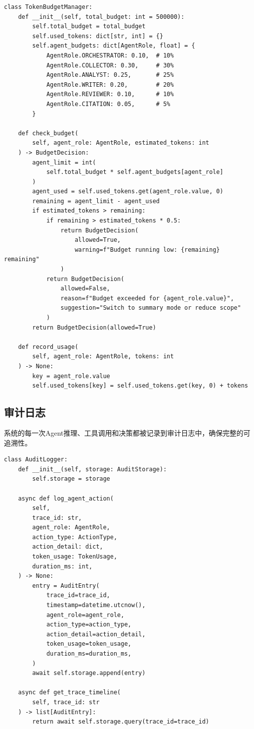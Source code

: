 \documentclass[12pt,a4paper]{ctexrep}
\begin{document}
\begin{lstlisting}[language=Python3,caption=Token预算管理器,label=lst:token-budget]
class TokenBudgetManager:
    def __init__(self, total_budget: int = 500000):
        self.total_budget = total_budget
        self.used_tokens: dict[str, int] = {}
        self.agent_budgets: dict[AgentRole, float] = {
            AgentRole.ORCHESTRATOR: 0.10,  # 10%
            AgentRole.COLLECTOR: 0.30,     # 30%
            AgentRole.ANALYST: 0.25,       # 25%
            AgentRole.WRITER: 0.20,        # 20%
            AgentRole.REVIEWER: 0.10,      # 10%
            AgentRole.CITATION: 0.05,      # 5%
        }

    def check_budget(
        self, agent_role: AgentRole, estimated_tokens: int
    ) -> BudgetDecision:
        agent_limit = int(
            self.total_budget * self.agent_budgets[agent_role]
        )
        agent_used = self.used_tokens.get(agent_role.value, 0)
        remaining = agent_limit - agent_used
        if estimated_tokens > remaining:
            if remaining > estimated_tokens * 0.5:
                return BudgetDecision(
                    allowed=True,
                    warning=f"Budget running low: {remaining} remaining"
                )
            return BudgetDecision(
                allowed=False,
                reason=f"Budget exceeded for {agent_role.value}",
                suggestion="Switch to summary mode or reduce scope"
            )
        return BudgetDecision(allowed=True)

    def record_usage(
        self, agent_role: AgentRole, tokens: int
    ) -> None:
        key = agent_role.value
        self.used_tokens[key] = self.used_tokens.get(key, 0) + tokens
\end{lstlisting}

\subsection{审计日志}

系统的每一次Agent推理、工具调用和决策都被记录到审计日志中，确保完整的可追溯性。

\begin{lstlisting}[language=Python3,caption=审计日志记录器,label=lst:audit]
class AuditLogger:
    def __init__(self, storage: AuditStorage):
        self.storage = storage

    async def log_agent_action(
        self,
        trace_id: str,
        agent_role: AgentRole,
        action_type: ActionType,
        action_detail: dict,
        token_usage: TokenUsage,
        duration_ms: int,
    ) -> None:
        entry = AuditEntry(
            trace_id=trace_id,
            timestamp=datetime.utcnow(),
            agent_role=agent_role,
            action_type=action_type,
            action_detail=action_detail,
            token_usage=token_usage,
            duration_ms=duration_ms,
        )
        await self.storage.append(entry)

    async def get_trace_timeline(
        self, trace_id: str
    ) -> list[AuditEntry]:
        return await self.storage.query(trace_id=trace_id)
\end{lstlisting}
\end{document}
